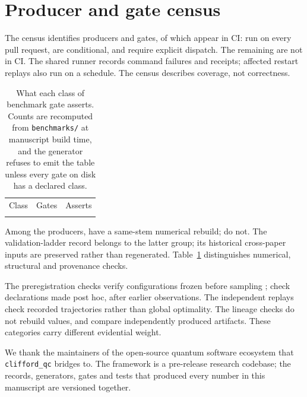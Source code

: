 \documentclass[aps,pra,reprint,superscriptaddress,nofootinbib,floatfix,
  showkeys]{revtex4-2}
\newcommand{\pkg}{\texttt{clifford\_qc}}
\begin{document}
\section{Producer and gate census}
\label{app:gates}

The census identifies \cqcProducers{} producers and \cqcGates{} gates, of
which \cqcGatesInWorkflow{} appear in CI: \cqcGatesAutomatic{} run on every
pull request, \cqcGatesConditional{} are conditional, and \cqcGatesFullReplay{}
require explicit dispatch. The remaining \cqcGatesAbsent{} are not in CI.
The shared runner records command failures and receipts; affected restart
replays also run on a schedule. The census describes coverage, not correctness.

\begin{table}
  \caption{What each class of benchmark gate asserts.  Counts are recomputed
  from \texttt{benchmarks/} at manuscript build time, and the generator refuses
  to emit the table unless every gate on disk has a declared class.}
  \label{tab:gates}
  \footnotesize
  \begin{ruledtabular}
  \begin{tabular}{lrp{}}
  Class & Gates & Asserts \\
  \colrule
  
  \end{tabular}
  \end{ruledtabular}
\end{table}

Among the producers, \cqcSameStemPairs{} have a same-stem numerical rebuild;
\cqcProducersWithoutGate{} do not. The validation-ladder record belongs to the
latter group; its historical cross-paper inputs are preserved rather than
regenerated. Table~\ref{tab:gates} distinguishes numerical, structural and
provenance checks.

The \cqcGatesPrereg{} preregistration checks verify configurations frozen before
sampling \cite{nosek2018preregistration}; \cqcGatesPostHoc{} check declarations
made post hoc, after earlier observations. The \cqcGatesReplay{} independent
replays check recorded trajectories rather than global optimality. The
\cqcGatesLineage{} lineage checks do not rebuild values, and
\cqcGatesCrossArtifact{} compare independently produced artifacts. These
categories carry different evidential weight.

\begin{acknowledgments}
We thank the maintainers of the open-source quantum software ecosystem that
\pkg{} bridges to.  The framework is a pre-release research codebase; the
records, generators, gates and tests that produced every number in this
manuscript are versioned together.
\end{acknowledgments}



\end{document}
